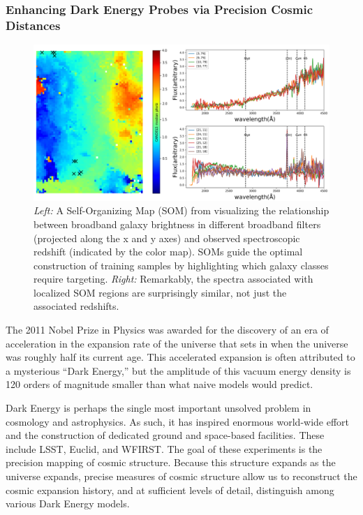 \documentclass[oneside,11pt]{amsart}
\newcommand{\comment}[2][todo]{{\color{#1}[[{\bf #2}]]}}
\begin{document}
\subsubsection{Enhancing Dark Energy Probes via Precision Cosmic Distances}
\label{sec:cosmology}
\noindent \comment{1 page}


\begin{figure}[h!]
 \vskip -0.1in
 \includegraphics[width=\textwidth]{Hemmati18_Fig8_VVDS_spec.png}
 \caption{\small \emph{Left:} A Self-Organizing Map (SOM) from \citet{hemmati18} visualizing the relationship between
 broadband galaxy brightness in different broadband filters (projected along the x and y axes) and observed
 spectroscopic redshift (indicated by the color map).  SOMs guide the optimal construction of training samples by
 highlighting which galaxy classes require targeting.  \emph{Right:} Remarkably, the spectra associated with localized
 SOM regions are surprisingly similar, not just the associated redshifts.}\label{fig:SOM}
\end{figure}

The 2011 Nobel Prize in Physics was awarded for the discovery of an era of acceleration in the expansion rate of the
universe that sets in when the universe was roughly half its current age.  This accelerated expansion is often
attributed to a mysterious ``Dark Energy,'' but the amplitude of this vacuum energy density is 120 orders of magnitude
smaller than what naive models would predict.

Dark Energy is perhaps the single most important unsolved problem in cosmology and astrophysics.  As such, it has
inspired enormous world-wide effort and the construction of dedicated ground and space-based facilities.  These include
LSST, Euclid, and WFIRST.  The goal of these experiments is the precision mapping of cosmic structure.  Because this
structure expands as the universe expands, precise measures of cosmic structure allow us to reconstruct the cosmic
expansion history, and at sufficient levels of detail, distinguish among various Dark Energy models.
\end{document}
